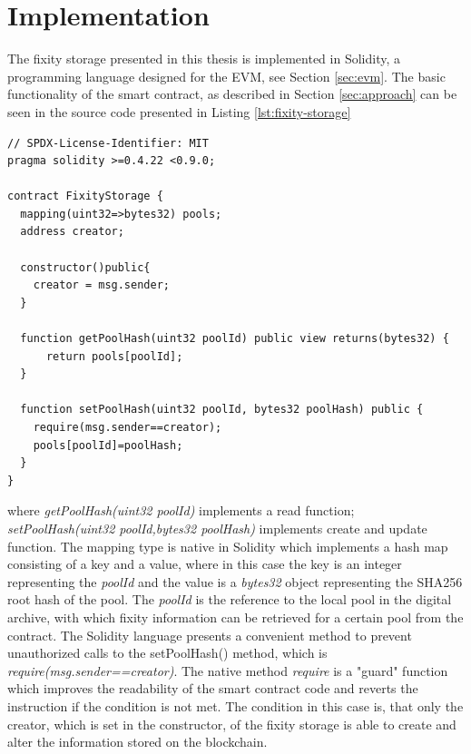 \documentclass[final]{vutinfth}
\begin{document}
\section{Implementation}
\label{sec:implementation}
The fixity storage presented in this thesis is implemented in Solidity, a programming language designed for the EVM, see Section \ref{sec:evm}.
The basic functionality of the smart contract, as described in Section \ref{sec:approach} can be seen in the source code presented in Listing \ref{lst:fixity-storage}
\begin{lstlisting}[language=Solidity,caption={MVP source code of the fixity storage deployed on the Ropsten test network \url{https://Ropsten.etherscan.io/address/0x0243c7aa552730E8C6F7ED25A480a7C0c88a70f0}},label=lst:fixity-storage]
// SPDX-License-Identifier: MIT
pragma solidity >=0.4.22 <0.9.0;

contract FixityStorage {
  mapping(uint32=>bytes32) pools;
  address creator;

  constructor()public{
    creator = msg.sender;
  }

  function getPoolHash(uint32 poolId) public view returns(bytes32) {
      return pools[poolId];
  }

  function setPoolHash(uint32 poolId, bytes32 poolHash) public {
    require(msg.sender==creator);
    pools[poolId]=poolHash;
  }
}
\end{lstlisting}
where \textit{getPoolHash(uint32 poolId)} implements a read function; \textit{setPoolHash(uint32 poolId,bytes32 poolHash)} implements create and update function. The mapping type is native in Solidity which implements a hash map consisting of a key and a value, where in this case the key is an integer representing the \textit{poolId} and the value is a \textit{bytes32} object representing the SHA256 root hash of the pool. The \textit{poolId} is the reference to the local pool in the digital archive, with which fixity information can be retrieved for a certain pool from the contract. The Solidity language presents a convenient  method to prevent unauthorized calls to the setPoolHash() method, which is \textit{require(msg.sender==creator)}. The native method \textit{require} is a "guard" function which improves the readability of the smart contract code and reverts the instruction if the condition is not met. The condition in this case is, that only the creator, which is set in the constructor, of the fixity storage is able to create and alter the information stored on the blockchain.
\end{document}
